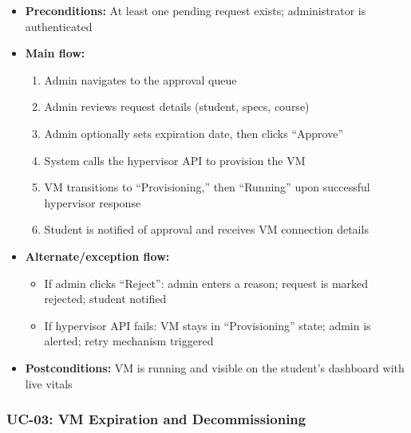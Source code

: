 \documentclass[12pt,letterpaper]{article}
\begin{document}
\begin{itemize}
  \item \textbf{Preconditions:} At least one pending request exists; administrator is authenticated
  \item \textbf{Main flow:}
    \begin{enumerate}
      \item Admin navigates to the approval queue
      \item Admin reviews request details (student, specs, course)
      \item Admin optionally sets expiration date, then clicks ``Approve''
      \item System calls the hypervisor API to provision the VM
      \item VM transitions to ``Provisioning,'' then ``Running'' upon successful hypervisor response
      \item Student is notified of approval and receives VM connection details
    \end{enumerate}
  \item \textbf{Alternate/exception flow:}
    \begin{itemize}
      \item If admin clicks ``Reject'': admin enters a reason; request is marked rejected; student notified
      \item If hypervisor API fails: VM stays in ``Provisioning'' state; admin is alerted; retry mechanism triggered
    \end{itemize}
  \item \textbf{Postconditions:} VM is running and visible on the student's dashboard with live vitals
\end{itemize}

\subsubsection*{UC-03: VM Expiration and Decommissioning}
\end{document}
